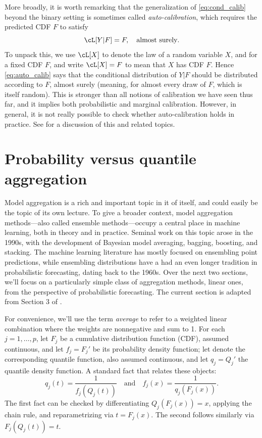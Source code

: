 \documentclass{article}
\begin{document}
More broadly, it is worth remarking that the generalization of
\eqref{eq:cond_calib} beyond the binary setting is sometimes called
\emph{auto-calibration}, which requires the predicted CDF $F$ to satisfy  
\begin{equation}  
\label{eq:auto_calib}
\cL[Y|F] = F, \quad \text{almost surely}.  
\end{equation}
To unpack this, we use $\cL[X]$ to denote the law of a random variable $X$, and 
for a fixed CDF $F$, and write $\cL[X] = F$ to mean that $X$ has CDF
$F$. Hence \eqref{eq:auto_calib} says that the conditional distribution of $Y|F$
should be distributed according to $F$, almost surely (meaning, for almost every
draw of $F$, which is itself random). This is stronger than all notions of
calibration we have seen thus far, and it implies both probabilistic and
marginal calibration. However, in general, it is not really possible to check
whether auto-calibration holds in practice. See \citet{gneiting2022regression}
for a discussion of this and related topics. 

\section{Probability versus quantile aggregation}
\label{sec:prob_quant}

Model aggregation is a rich and important topic in it of itself, and could
easily be the topic of its own lecture. To give a broader context, model
aggregation methods---also called ensemble methods---occupy a central place in
machine learning, both in theory and in practice. Seminal work on this topic
arose in the 1990s, with the development of Bayesian model averaging, bagging,
boosting, and stacking. The machine learning literature has mostly focused on
ensembling point predictions, while ensembling distributions have a had an even 
longer tradition in probabilistic forecasting, dating back to the 1960s. Over
the next two sections, we'll focus on a particularly simple class of aggregation 
methods, linear ones, from the perspective of probabilistic forecasting. The
current section is adapted from Section 3 of  \citet{fakoor2021flexible}.

For convenience, we'll use the term \emph{average} to refer to a weighted linear
combination where the weights are nonnegative and sum to 1. For each
$j=1,\dots,p$, let $F_j$ be a cumulative distribution function (CDF), assumed
continuous, and let $f_j=F_j'$ be its probability density function; let
 denote the corresponding quantile function, also
assumed continuous, and let $q_j=Q_j'$ the quantile density function. A standard
fact that relates these 
objects:    
\begin{equation}
\label{eq:prob_quant}
q_j(t) = \frac{1}{f_j(Q_j(t))} \quad \text{and} \quad 
f_j(x) = \frac{1}{q_j(F_j(x))}.  
\end{equation}
The first fact can be checked by differentiating $Q_j(F_j(x)) = x$, applying the
chain rule, and reparametrizing via $t=F_j(x)$. The second follows similarly via
$F_j(Q_j(t)) = t$.
\end{document}
